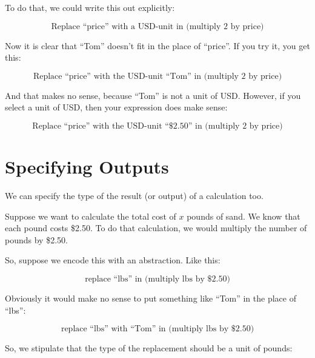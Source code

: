 \documentclass{book}
\numberwithin{equation}{chapter}
\begin{document}
To do that, we could write this out explicitly:

\begin{equation}
\text{Replace ``price'' with a USD-unit in (multiply 2 by price)}
\end{equation}

\noindent
Now it is clear that ``Tom'' doesn't fit in the place of ``price''. If you try it, you get this:

\begin{equation}
\text{Replace ``price'' with the USD-unit ``Tom'' in (multiply 2 by price)}
\end{equation}

\noindent
And that makes no sense, because ``Tom'' is not a unit of USD. However, if you select a unit of USD, then your expression does make sense:

\begin{equation}
\text{Replace ``price'' with the USD-unit ``\$2.50'' in (multiply 2 by price)}
\end{equation}


\section{Specifying Outputs}

We can specify the type of the result (or output) of a calculation too.

Suppose we want to calculate the total cost of $x$ pounds of sand. We know that each pound costs \$2.50. To do that calculation, we would multiply the number of pounds by \$2.50.

So, suppose we encode this with an abstraction. Like this:

\begin{equation}
\text{replace ``lbs'' in (multiply lbs by \$2.50)}
\end{equation}

\noindent
Obviously it would make no sense to put something like ``Tom'' in the place of ``lbs'':

\begin{equation}
\text{replace ``lbs'' with ``Tom'' in (multiply lbs by \$2.50)}
\end{equation}

\noindent
So, we stipulate that the type of the replacement should be a unit of pounds:
\end{document}
